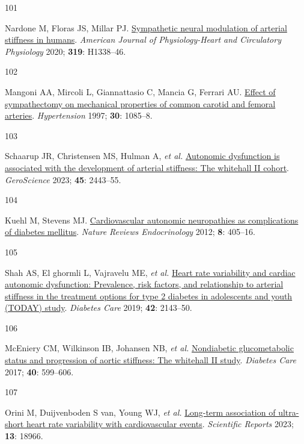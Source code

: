 \documentclass[
  a4paper,
  headsepline=true,
  open=left]{scrbook}
\newlength{\cslhangindent}
\newlength{\csllabelwidth}
\newlength{\cslentryspacingunit} %
\newenvironment{CSLReferences}[2] %
 {%
  \setlength{\parindent}{0pt}
  \ifodd #1
  \let\oldpar\par
  \def\par{\hangindent=\cslhangindent\oldpar}
  \fi
  \setlength{\parskip}{#2\cslentryspacingunit}
 }%
 {}
\newcommand{\CSLLeftMargin}[1]{\parbox[t]{\csllabelwidth}{#1}}
\newcommand{\CSLRightInline}[1]{\parbox[t]{\linewidth - \csllabelwidth}{#1}\break}
\begin{document}
\begin{CSLReferences}{0}{0}
\leavevmode{}%
\CSLLeftMargin{101 }%
\CSLRightInline{Nardone M, Floras JS, Millar PJ.
\href{https://doi.org/10.1152/ajpheart.00734.2020}{Sympathetic neural
modulation of arterial stiffness in humans}. \emph{American Journal of
Physiology-Heart and Circulatory Physiology} 2020; \textbf{319}:
H1338--46.}

\leavevmode{}%
\CSLLeftMargin{102 }%
\CSLRightInline{Mangoni AA, Mircoli L, Giannattasio C, Mancia G, Ferrari
AU. \href{https://doi.org/10.1161/01.HYP.30.5.1085}{Effect of
sympathectomy on mechanical properties of common carotid and femoral
arteries}. \emph{Hypertension} 1997; \textbf{30}: 1085--8.}

\leavevmode{}%
\CSLLeftMargin{103 }%
\CSLRightInline{Schaarup JR, Christensen MS, Hulman A, \emph{et al.}
\href{https://doi.org/10.1007/s11357-023-00762-0}{Autonomic dysfunction
is associated with the development of arterial stiffness: The whitehall
II cohort}. \emph{GeroScience} 2023; \textbf{45}: 2443--55.}

\leavevmode{}%
\CSLLeftMargin{104 }%
\CSLRightInline{Kuehl M, Stevens MJ.
\href{https://doi.org/10.1038/nrendo.2012.21}{Cardiovascular autonomic
neuropathies as complications of diabetes mellitus}. \emph{Nature
Reviews Endocrinology} 2012; \textbf{8}: 405--16.}

\leavevmode{}%
\CSLLeftMargin{105 }%
\CSLRightInline{Shah AS, El ghormli L, Vajravelu ME, \emph{et al.}
\href{https://doi.org/10.2337/dc19-0993}{Heart rate variability and
cardiac autonomic dysfunction: Prevalence, risk factors, and
relationship to arterial stiffness in the treatment options for type 2
diabetes in adolescents and youth (TODAY) study}. \emph{Diabetes Care}
2019; \textbf{42}: 2143--50.}

\leavevmode{}%
\CSLLeftMargin{106 }%
\CSLRightInline{McEniery CM, Wilkinson IB, Johansen NB, \emph{et al.}
\href{https://doi.org/10.2337/dc16-1773}{Nondiabetic glucometabolic
status and progression of aortic stiffness: The whitehall II study}.
\emph{Diabetes Care} 2017; \textbf{40}: 599--606.}

\leavevmode{}%
\CSLLeftMargin{107 }%
\CSLRightInline{Orini M, Duijvenboden S van, Young WJ, \emph{et al.}
\href{https://doi.org/10.1038/s41598-023-45988-2}{Long-term association
of ultra-short heart rate variability with cardiovascular events}.
\emph{Scientific Reports} 2023; \textbf{13}: 18966.}


\end{CSLReferences}
\end{document}
